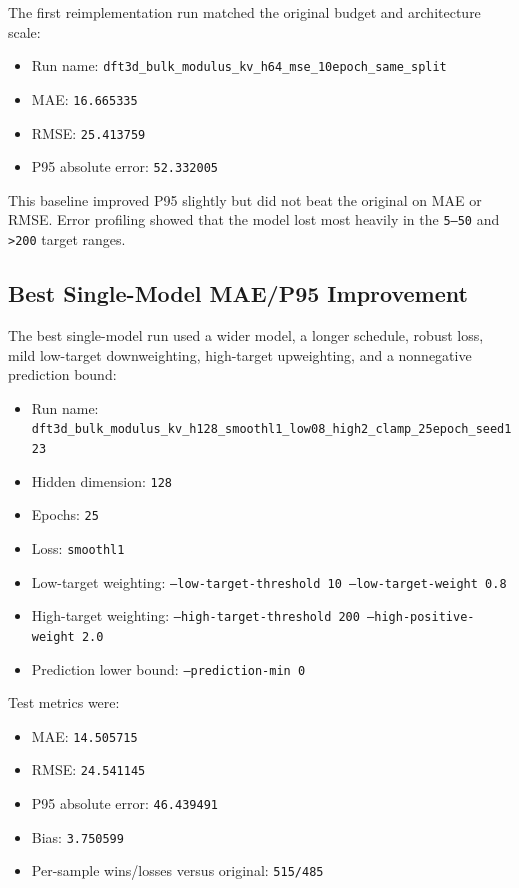 \documentclass[11pt]{article}
\begin{document}
The first reimplementation run matched the original budget and architecture scale:
\begin{itemize}
  \item Run name: \texttt{dft3d\_bulk\_modulus\_kv\_h64\_mse\_10epoch\_same\_split}
  \item MAE: \texttt{16.665335}
  \item RMSE: \texttt{25.413759}
  \item P95 absolute error: \texttt{52.332005}
\end{itemize}

This baseline improved P95 slightly but did not beat the original on MAE or RMSE.  Error profiling showed that the model lost most heavily in the \texttt{5--50} and \texttt{>200} target ranges.

\subsection{Best Single-Model MAE/P95 Improvement}

The best single-model run used a wider model, a longer schedule, robust loss, mild low-target downweighting, high-target upweighting, and a nonnegative prediction bound:
\begin{itemize}
  \item Run name: \texttt{dft3d\_bulk\_modulus\_kv\_h128\_smoothl1\_low08\_high2\_clamp\_25epoch\_seed123}
  \item Hidden dimension: \texttt{128}
  \item Epochs: \texttt{25}
  \item Loss: \texttt{smoothl1}
  \item Low-target weighting: \texttt{--low-target-threshold 10 --low-target-weight 0.8}
  \item High-target weighting: \texttt{--high-target-threshold 200 --high-positive-weight 2.0}
  \item Prediction lower bound: \texttt{--prediction-min 0}
\end{itemize}

Test metrics were:
\begin{itemize}
  \item MAE: \texttt{14.505715}
  \item RMSE: \texttt{24.541145}
  \item P95 absolute error: \texttt{46.439491}
  \item Bias: \texttt{3.750599}
  \item Per-sample wins/losses versus original: \texttt{515/485}
\end{itemize}
\end{document}
